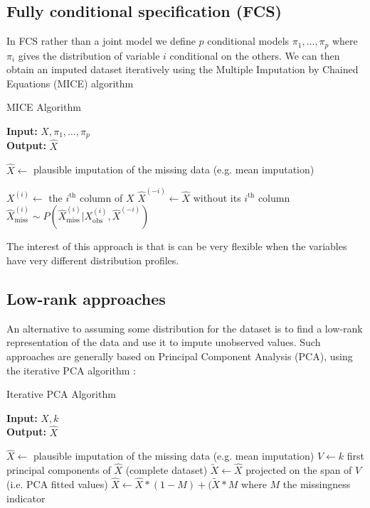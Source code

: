 		\subsection{Fully conditional specification (FCS)}
In FCS rather than a joint model we define $p$ conditional models $\pi_1, \ldots, \pi_p$ where $\pi_i$ gives the distribution of variable $i$ conditional on the others. We can then obtain an imputed dataset iteratively using the Multiple Imputation by Chained Equations (MICE) algorithm \cite{MICE_founding}
\begin{algorithm}[H]
	\caption{MICE Algorithm}
	\hspace*{\algorithmicindent} \textbf{Input:} $X, \pi_1, \ldots, \pi_p$  \\
 	\hspace*{\algorithmicindent} \textbf{Output:} $\hat{X}$
	\begin{algorithmic}[1]
		\State $\hat{X} \leftarrow $ plausible imputation of the missing data (e.g. mean imputation)

				\State $X^{(i)} \leftarrow $ the $i^{\text{th}}$ column of $X$
				\State $\hat{X}^{(-i)} \leftarrow \hat{X}$  without its $i^{\text{th}}$ column
				\State $\hat{X}^{(i)}_{\text{miss}} \sim P(\hat{X}^{(i)}_{\text{miss}} \vert {X}^{(i)}_{\text{obs}}, \hat{X}^{(-i)})$
			\EndFor
		\EndWhile
	\end{algorithmic}
\end{algorithm}

The interest of this approach is that is can be very flexible when the variables have very different distribution profiles. 
		\subsection{Low-rank approaches}
An alternative to assuming some distribution for the dataset is to find a low-rank representation of the data and use it to impute unobserved values. Such approaches \cite{josse2012missPCA}\cite{chen2004missSVD}\cite{brand2002incremental} are generally based on Principal Component Analysis (PCA)\cite{PCA}, using the iterative PCA algorithm \cite{iter_PCA}:		
		\begin{algorithm}[H]
	\caption{Iterative PCA Algorithm}
	\hspace*{\algorithmicindent} \textbf{Input:} $X, k$  \\
 	\hspace*{\algorithmicindent} \textbf{Output:} $\hat{X}$
	\begin{algorithmic}[1]
		\State $\hat{X} \leftarrow $ plausible imputation of the missing data (e.g. mean imputation)
			\State $V \leftarrow k$ first principal components of $\hat{X}$ (complete dataset)
			\State $\tilde{X} \leftarrow \hat{X}$ projected on the span of $V$ (i.e. PCA fitted values)
			\State $\hat{X} \leftarrow \hat{X} * (1-M) + (\tilde{X} * M$ where $M$ the missingness indicator
		\EndWhile
	\end{algorithmic}
\end{algorithm}		

